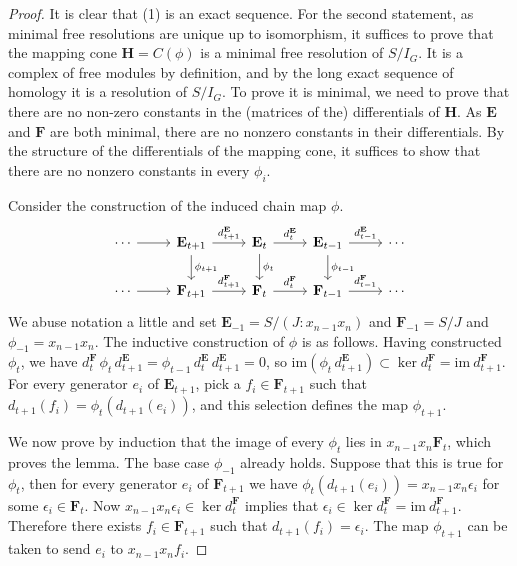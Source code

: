 \documentclass[dvipsnames,10pt]{article}
\begin{document}
\begin{proof}
    It is clear that (1) is an exact sequence. For the second statement, as minimal free resolutions are unique up to isomorphism, it suffices to prove that the mapping cone $\mathbf{H}=C(\phi)$ is a minimal free resolution of $S/I_G$. It is a complex of free modules by definition, and by the long exact sequence of homology it is a resolution of $S/I_G$. To prove it is minimal, we need to prove that there are no non-zero constants in the (matrices of the) differentials of $\mathbf{H}$. As $\mathbf{E}$ and $\mathbf{F}$ are both minimal, there are no nonzero constants in their differentials. By the structure of the differentials of the mapping cone, it suffices to show that there are no nonzero constants in every $\phi_i$.
    
    Consider the construction of the induced chain map $\phi$.
    \begin{equation*}
        \begin{tikzcd}
            \cdots \arrow[r] & \mathbf{E}_{t+1} \arrow[r, "{d_{t+1}^\mathbf{E}}"] \arrow[d,"{\phi_{t+1}}"] & \mathbf{E}_t \arrow[r, "{d_{t}^\mathbf{E}}"]\arrow[d,"{\phi_{t}}"] & \mathbf{E}_{t-1}\arrow[r, "{d_{t-1}^\mathbf{E}}"]\arrow[d,"{\phi_{t-1}}"]  & \cdots \\
            \cdots \arrow[r]  & \mathbf{F}_{t+1}\arrow[r, "{d_{t+1}^\mathbf{F}}"]  & \mathbf{F}_t \arrow[r, "{d_{t}^\mathbf{F}}"] & \mathbf{F}_{t-1}\arrow[r, "{d_{t-1}^\mathbf{F}}"]  & \cdots
        \end{tikzcd}
    \end{equation*}
    We abuse notation a little and set $\mathbf{E}_{-1}=S/(J:x_{n-1}x_n)$ and $\mathbf{F}_{-1}=S/J$ and $\phi_{-1}=x_{n-1}x_n$. The inductive construction of $\phi$ is as follows. Having constructed $\phi_t$, we have $d_t^\mathbf{F}\,\phi_t\,d_{t+1}^\mathbf{E}=\phi_{t-1}\,d_{t}^\mathbf{E}\,d_{t+1}^\mathbf{E}=0$, so $\mathrm{im}(\phi_t\,d_{t+1}^\mathbf{E})\subset \ker d_t^\mathbf{F}=\mathrm{im}\:d_{t+1}^\mathbf{F}$. For every generator $e_i$ of $\mathbf{E}_{t+1}$, pick a $f_i\in \mathbf{F}_{t+1}$ such that $d_{t+1}(f_i)=\phi_t(d_{t+1}(e_i))$, and this selection defines the map $\phi_{t+1}$.
    
    We now prove by induction that the image of every $\phi_t$ lies in $x_{n-1}x_n\mathbf{F}_t$, which proves the lemma. The base case $\phi_{-1}$ already holds. Suppose that this is true for $\phi_t$, then for every generator $e_i$ of $\mathbf{F}_{t+1}$ we have $\phi_t(d_{t+1}(e_i))=x_{n-1}x_n\epsilon_i$ for some $\epsilon_i\in \mathbf{F}_t$. Now $x_{n-1}x_n\epsilon_i\in \ker d_{t}^\mathbf{F}$ implies that $\epsilon_i\in \ker d_{t}^\mathbf{F}=\mathrm{im}\: d_{t+1}^\mathbf{F}$. Therefore there exists $f_i\in \mathbf{F}_{t+1}$ such that $d_{t+1}(f_i)=\epsilon_i$. The map $\phi_{t+1}$ can be taken to send $e_i$ to $x_{n-1}x_nf_i$.
\end{proof}
\end{document}
